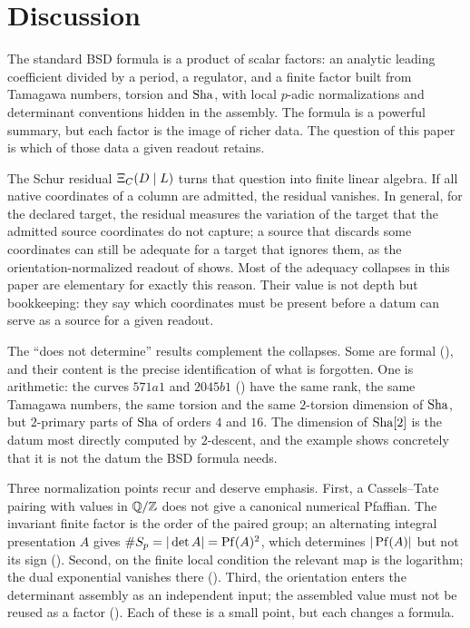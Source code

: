 \section{Discussion}\label{sec:discussion}

The standard BSD formula is a product of scalar factors: an analytic
leading coefficient divided by a period, a regulator, and a finite factor
built from Tamagawa numbers, torsion and $\operatorname{Sha}$, with local $p$-adic
normalizations and determinant conventions hidden in the assembly.  The
formula is a powerful summary, but each factor is the image of richer
data.  The question of this paper is which of those data a given readout
retains.

The Schur residual $\Xi_C(D\mid L)$ turns that question into finite linear algebra.
If all native coordinates of a column are admitted, the residual vanishes.
In general, for the declared target, the residual measures the variation
of the target that the admitted source coordinates do not capture; a
source that discards some coordinates can still be adequate for a target
that ignores them, as the orientation-normalized readout of
 shows.  Most of the adequacy
collapses in this paper are elementary for exactly this reason.  Their
value is not depth but bookkeeping: they say which coordinates must be
present before a datum can serve as a source for a given readout.

The ``does not determine'' results complement the collapses.  Some are
formal (),
and their content is the precise identification of what is forgotten.
One is arithmetic: the curves $571a1$ and $2045b1$
() have the same rank, the same Tamagawa
numbers, the same torsion and the same $2$-torsion dimension of $\operatorname{Sha}$,
but $2$-primary parts of $\operatorname{Sha}$ of orders $4$ and $16$.  The dimension of
$\operatorname{Sha}[2]$ is the datum most directly computed by $2$-descent, and the
example shows concretely that it is not the datum the BSD formula needs.

Three normalization points recur and deserve emphasis.  First, a
Cassels--Tate pairing with values in $\mathbb{Q}/\mathbb{Z}$ does not give a canonical
numerical Pfaffian.  The invariant finite factor is the order of the
paired group; an alternating integral presentation $A$ gives
$\#S_p=|\det A|=\operatorname{Pf}(A)^2$, which determines $|\operatorname{Pf}(A)|$ but not its sign
().  Second, on the finite
local condition the relevant map is the logarithm; the dual exponential
vanishes there ().  Third, the orientation enters the
determinant assembly as an independent input; the assembled value must
not be reused as a factor ().  Each
of these is a small point, but each changes a formula.

